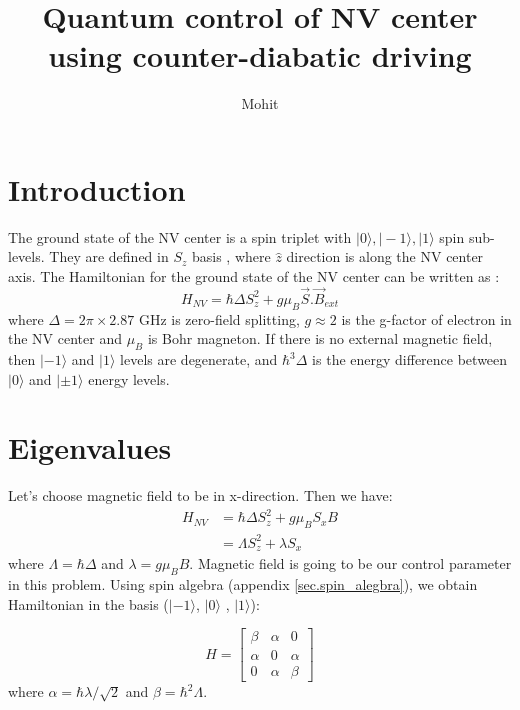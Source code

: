 \documentclass[11pt,a4paper]{article}
\author{Mohit}
\title{Quantum control of NV center using counter-diabatic driving  }
\begin{document}
\maketitle

\section{Introduction}
The ground state of the NV center is a spin triplet with $| 0 \rangle, | -1 \rangle, | 1 \rangle$ spin sub-levels. They are defined in $S_z$ basis , where $\hat{z}$ direction is along the NV center axis. The Hamiltonian for the ground state of the NV center can be written as \cite{dhingra2017nitrogen}:
\begin{equation}
H_{NV}= \hbar \Delta S_z^2 + g \mu_B \vec{S}. \vec{B}_{ext} 
\end{equation}
where $\Delta= 2 \pi \times 2.87 $ GHz is zero-field splitting, $g \approx 2$ is the g-factor of electron in the NV center and $\mu_B$ is Bohr magneton. If there is no external magnetic field, then $| -1 \rangle$ and $| 1 \rangle$ levels are degenerate, and  $ \hbar^3 \Delta$ is the energy difference between $| 0 \rangle$ and $| \pm 1 \rangle$ energy levels.

\section{Eigenvalues}

Let's choose magnetic field to be in x-direction. Then we have:
\begin{align*}
H_{NV} &= \hbar \Delta S_z^2 + g \mu_B   S_x  B \\
 &= \Lambda S_z^2 + \lambda   S_x  
\end{align*}
where $\Lambda= \hbar \Delta $ and $\lambda=g \mu_B    B $. Magnetic field is going to be our control parameter in this problem. Using spin algebra  (appendix \ref{sec.spin_alegbra}), we obtain Hamiltonian in the basis ($|- 1\rangle$, $| 0 \rangle$ , $| 1 \rangle$):

\begin{equation}
H= \begin{bmatrix}
    \beta       & \alpha  & 0  \\
    \alpha       & 0 &\alpha  \\
     0       & \alpha & \beta
\end{bmatrix}
\end{equation}
where $\alpha= \hbar \lambda/ \sqrt{2} $ and $\beta= \hbar^2 \Lambda$.
\end{document}
